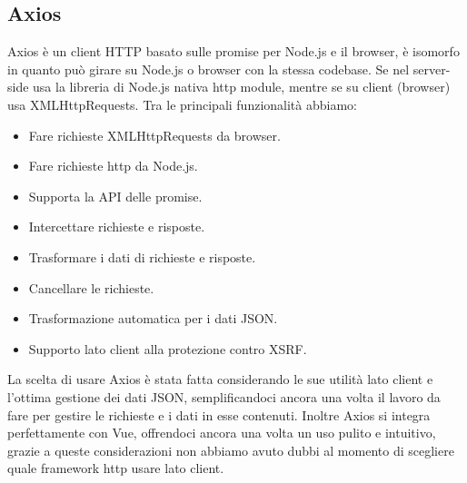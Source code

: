 \documentclass{article}
\begin{document}
\subsection{Axios}
Axios è un client HTTP basato sulle promise per Node.js e il browser, è isomorfo in quanto può girare su Node.js o browser con la stessa codebase. Se nel server-side usa la libreria di Node.js nativa http module, mentre se su client (browser) usa XMLHttpRequests.
Tra le principali funzionalità abbiamo:
\begin{itemize}
	\item Fare richieste XMLHttpRequests da browser.
	\item Fare richieste http da Node.js.
	\item Supporta la API delle promise.
	\item Intercettare richieste e risposte.
	\item Trasformare i dati di richieste e risposte.
	\item Cancellare le richieste.
	\item Trasformazione automatica per i dati JSON.
	\item Supporto lato client alla protezione contro XSRF.
\end{itemize}
La scelta di usare Axios è stata fatta considerando le sue utilità lato client e l'ottima gestione dei dati JSON, semplificandoci ancora una volta il lavoro da fare per gestire le richieste e i dati in esse contenuti. Inoltre Axios si integra perfettamente con Vue, offrendoci ancora una volta un uso pulito e intuitivo, grazie a queste considerazioni non abbiamo avuto dubbi al momento di scegliere quale framework http usare lato client.
\end{document}
